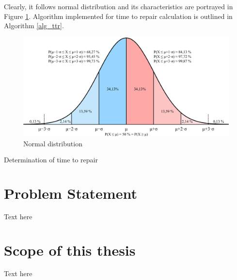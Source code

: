 Clearly, it follows normal distribution and its characteristics are portrayed in Figure \ref{F6_Norm}. Algorithm implemented for time to repair calculation is outlined in Algorithm \ref{alg_ttr}.


  \begin{figure}[htb]
    \centering
    \includegraphics[width=1\textwidth]{Figures/1/Normal_Distribution_Sigma.png}
    \caption{Normal distribution \cite{kowarschick_english_2012}}
    \label{F6_Norm}
\end{figure}
 




\begin{algorithm}[ht]
\SetAlgoLined
 \caption{Determination of time to repair}\label{alg_ttr}
\end{algorithm}






\section{Problem Statement}
Text here
\section{Scope of this thesis}
Text here
